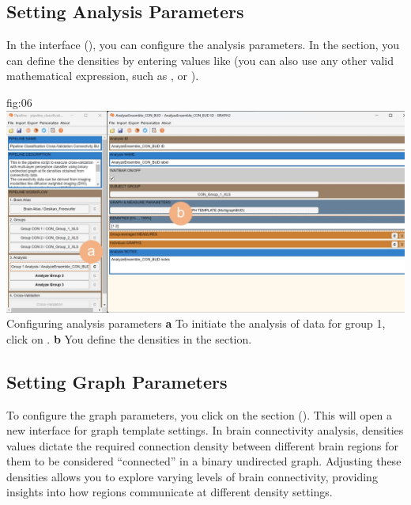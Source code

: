 \documentclass[justified]{tufte-handout}
\begin{document}
{\subsection{Setting Analysis Parameters}

In the  interface (), you can configure the analysis parameters.
In the  section, you can define the densities by entering values like  (you can also use any other valid mathematical expression, such as , or ).


	{fig:06}
	{
	\includegraphics{fig06.jpg}
	}
	{Configuring analysis parameters}
	{
	{\bf a} To initiate the analysis of data for group 1, click on .
	{\bf b} You define the densities in the  section.
	}

\subsection{Setting Graph Parameters}

To configure the graph parameters, you click on the section  (). This will open a new interface for graph template settings. 
In brain connectivity analysis, densities values dictate the required connection density between different brain regions for them to be considered “connected” in a binary undirected graph. 
Adjusting these densities allows you to explore varying levels of brain connectivity, providing insights into how regions communicate at different density settings.


}
\end{document}
